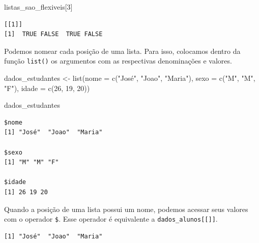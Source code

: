\documentclass[
  brazilian,
]{book}
\newenvironment{Shaded}{\begin{snugshade}}{\end{snugshade}}
\newcommand{\AttributeTok}[1]{\textcolor[rgb]{0.77,0.63,0.00}{#1}}
\newcommand{\CommentTok}[1]{\textcolor[rgb]{0.56,0.35,0.01}{\textit{#1}}}
\newcommand{\DecValTok}[1]{\textcolor[rgb]{0.00,0.00,0.81}{#1}}
\newcommand{\FunctionTok}[1]{\textcolor[rgb]{0.00,0.00,0.00}{#1}}
\newcommand{\NormalTok}[1]{#1}
\newcommand{\OtherTok}[1]{\textcolor[rgb]{0.56,0.35,0.01}{#1}}
\newcommand{\SpecialCharTok}[1]{\textcolor[rgb]{0.00,0.00,0.00}{#1}}
\newcommand{\StringTok}[1]{\textcolor[rgb]{0.31,0.60,0.02}{#1}}
\begin{document}
\begin{Shaded}
\begin{Highlighting}[]
\NormalTok{listas\_sao\_flexiveis[}\DecValTok{3}\NormalTok{]}
\end{Highlighting}
\end{Shaded}

\begin{verbatim}
[[1]]
[1]  TRUE FALSE  TRUE FALSE
\end{verbatim}

Podemos nomear cada posição de uma lista. Para isso, colocamos dentro da função \texttt{list()} os argumentos com as respectivas denominações e valores.

\begin{Shaded}
\begin{Highlighting}[]
\NormalTok{dados\_estudantes }\OtherTok{\textless{}{-}} \FunctionTok{list}\NormalTok{(}\AttributeTok{nome =} \FunctionTok{c}\NormalTok{(}\StringTok{"José"}\NormalTok{, }\StringTok{"Joao"}\NormalTok{, }\StringTok{"Maria"}\NormalTok{),}
                         \AttributeTok{sexo =} \FunctionTok{c}\NormalTok{(}\StringTok{"M"}\NormalTok{, }\StringTok{"M"}\NormalTok{, }\StringTok{"F"}\NormalTok{),}
                         \AttributeTok{idade =} \FunctionTok{c}\NormalTok{(}\DecValTok{26}\NormalTok{, }\DecValTok{19}\NormalTok{, }\DecValTok{20}\NormalTok{))}

\NormalTok{dados\_estudantes}
\end{Highlighting}
\end{Shaded}

\begin{verbatim}
$nome
[1] "José"  "Joao"  "Maria"

$sexo
[1] "M" "M" "F"

$idade
[1] 26 19 20
\end{verbatim}

Quando a posição de uma lista possui um nome, podemos acessar seus valores com o operador \texttt{\$}. Esse operador é equivalente a \texttt{dados\_alunos{[}{[}{]}{]}}.

\begin{Shaded}
\end{Shaded}

\begin{verbatim}
[1] "José"  "Joao"  "Maria"
\end{verbatim}
\end{document}
